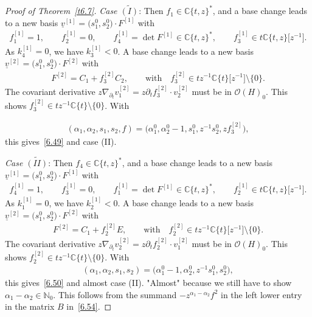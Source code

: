 \documentclass[10pt,a4paper]{amsart}
\numberwithin{equation}{section}
\numberwithin{figure}{section}
\newcommand{\N}{{\mathbb N}}
\newcommand{\C}{{\mathbb C}}
\newcommand{\OO}{{\mathcal O}}
\newcommand{\www}{\widetilde}
\newcommand{\uuuu}{\underline}
\newcommand{\paa}{\partial}
\newcommand{\nnn}{\nabla}
\begin{document}
\begin{proof}[Proof of Theorem~\ref{t6.7}]
\medskip\noindent
{\it Case $\www{(I)}$}: Then $f_1\in\C\{t,z\}^*$, and
a base change leads to a new basis
$\uuuu{v}^{[1]}=\big(s_1^0,s_2^0\big)\cdot F^{[1]}$ with
\begin{gather*}
f_1^{[1]}=1,\qquad f_2^{[1]}=0,
\qquad f_4^{[1]}=\det F^{[1]}\in \C\{t,z\}^*,
\qquad f_3^{[1]}\in t\C\{t,z\}\big[z^{-1}\big].
\end{gather*}
As $k_4^{[1]}=0$, we have $k_3^{[1]}<0$.
A base change leads to a new basis
$\uuuu{v}^{[2]}=\big(s_1^0,s_2^0\big)\cdot F^{[2]}$ with
\begin{gather*}
F^{[2]}=C_1 + f_3^{[2]}C_2, \qquad\text{with}\quad
f_3^{[2]}\in tz^{-1}\C\{t\}\big[z^{-1}\big]\setminus\{0\}.
\end{gather*}
The covariant derivative
$z\nnn_{\paa_t}v_1^{[2]}=z\paa_t f_3^{[2]}\cdot v_2^{[2]}$
must be in $\OO(H)_0$. This shows
$f_3^{[2]}\in tz^{-1}\C\{t\}\allowbreak\setminus\{0\}$. With
{\samepage\begin{gather*}%
(\alpha_1,\alpha_2,s_1,s_2,f)=\big(\alpha_1^0,\alpha_2^0-1,s_1^0,z^{-1}s_2^0,zf_3^{[2]}\big),
\end{gather*}
this gives~\eqref{6.49} and case (II).

}

\medskip\noindent
{\it Case $\www{(II)}$}: Then $f_4\in\C\{t,z\}^*$, and
a base change leads to a new basis
$\uuuu{v}^{[1]}=\big(s_1^0,s_2^0\big)\cdot F^{[1]}$ with
\begin{gather*}
f_4^{[1]}=1,\qquad f_3^{[1]}=0,
\qquad f_1^{[1]}=\det F^{[1]}\in \C\{t,z\}^*,
\qquad f_2^{[1]}\in t\C\{t,z\}\big[z^{-1}\big].
\end{gather*}
As $k_1^{[1]}=0$, we have $k_2^{[1]}<0$.
A base change leads to a new basis
$\uuuu{v}^{[2]}=\big(s_1^0,s_2^0\big)\cdot F^{[2]}$ with
\begin{gather*}
F^{[2]}=C_1 + f_2^{[2]}E, \qquad\text{with}\quad
f_2^{[2]}\in tz^{-1}\C\{t\}\big[z^{-1}\big]\setminus\{0\}.
\end{gather*}
The covariant derivative
$z\nnn_{\paa_t}v_2^{[2]}=z\paa_t f_2^{[2]}\cdot v_1^{[2]}$
must be in $\OO(H)_0$. This shows
$f_2^{[2]}\in tz^{-1}\C\{t\}\allowbreak\setminus\{0\}$. With
\begin{gather*}%
(\alpha_1,\alpha_2,s_1,s_2)=\big(\alpha_1^0-1,\alpha_2^0,z^{-1}s_1^0,s_2^0\big),
\end{gather*}
this gives~\eqref{6.50} and almost case (II).
{}"{}Almost{}"{} because we still have to show
$\alpha_1-\alpha_2\in\N_0$.
This follows from the summand $-z^{\alpha_1-\alpha_2}f^2$ in
the left lower entry in the matrix $B$ in~\eqref{6.54}.



\end{proof}
\end{document}
